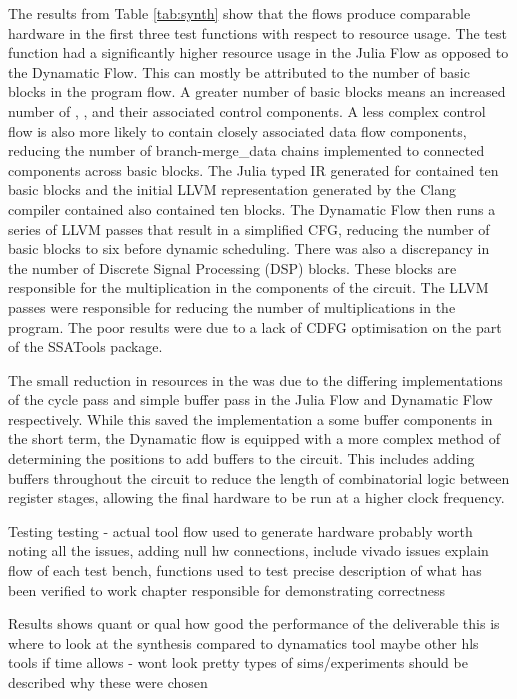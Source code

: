 The results from Table \ref{tab:synth} show that the flows produce comparable hardware in the first three test functions with respect to resource usage. The  test function had a significantly higher resource usage in the Julia Flow as opposed to the Dynamatic Flow. This can mostly be attributed to the number of basic blocks in the program flow. A greater number of basic blocks means an increased number of , , and their associated control components. A less complex control flow is also more likely to contain closely associated data flow components, reducing the number of branch-merge\_data chains implemented to connected components across basic blocks. The Julia typed IR generated for  contained ten basic blocks and the initial LLVM representation generated by the Clang compiler contained also contained ten blocks. The Dynamatic Flow then runs a series of LLVM passes that result in a simplified CFG, reducing the number of basic blocks to six before dynamic scheduling. There was also a discrepancy in the number of Discrete Signal Processing (DSP) blocks. These blocks are responsible for the multiplication in the  components of the circuit. The LLVM passes were responsible for reducing the number of multiplications in the program. The poor results were due to a lack of CDFG optimisation on the part of the SSATools package. %

The small reduction in resources in the  was due to the differing implementations of the cycle pass and simple buffer pass in the Julia Flow and Dynamatic Flow respectively. While this saved the implementation a some buffer components in the short term, the Dynamatic flow is equipped with a more complex method of determining the positions to add buffers to the circuit. This includes adding buffers throughout the circuit to reduce the length of combinatorial logic between register stages, allowing the final hardware to be run at a higher clock frequency. 

\iffalse
Testing
testing - actual tool flow used to generate hardware
	probably worth noting all the issues, adding null hw connections, include vivado issues
explain flow of each test bench, functions used to test 
precise description of what has been verified to work
chapter responsible for demonstrating correctness

Results
shows quant or qual how good the performance of the deliverable
this is where to look at the synthesis compared to dynamatics tool maybe other hls tools if time allows - wont look pretty
types of sims/experiments should be described
	why these were chosen


